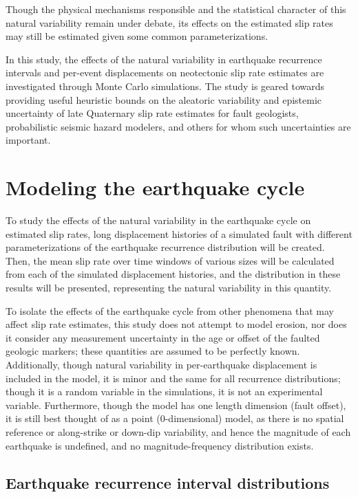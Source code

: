 \documentclass[se, manuscript]{copernicus}
\begin{document}
Though the physical mechanisms responsible and the statistical character of 
this natural variability remain under debate, its effects on the estimated slip 
rates may still be estimated given some common parameterizations.

In this study, the effects of the natural variability in earthquake
recurrence intervals and per-event displacements on neotectonic slip
rate estimates are investigated through Monte Carlo simulations. The
study is geared towards providing useful heuristic bounds on the
aleatoric variability and epistemic uncertainty of late Quaternary slip rate
estimates for fault geologists, probabilistic seismic hazard modelers,
and others for whom such uncertainties are important.


\section{Modeling the earthquake
cycle}\label{modeling-the-earthquake-cycle}

To study the effects of the natural variability in the earthquake cycle
on estimated slip rates, long displacement histories of a simulated
fault with different parameterizations of the earthquake recurrence
distribution will be created. Then, the mean slip rate over time windows
of various sizes will be calculated from each of the simulated
displacement histories, and the distribution in these results will be
presented, representing the natural variability in this quantity.

To isolate the effects of the earthquake cycle from other phenomena that
may affect slip rate estimates, this study does not attempt to model
erosion, nor does it consider any measurement uncertainty in the age or
offset of the faulted geologic markers; these quantities are assumed
to be perfectly known. Additionally, though natural variability in
per-earthquake displacement is included in the model, it is minor and
the same for all recurrence distributions; though it is a random variable in the
simulations, it is not an experimental variable. Furthermore, though the model
has one length dimension (fault offset), it is still best thought of as
a point (0-dimensional) model, as there is no spatial reference or
along-strike or down-dip variability, and hence the magnitude of each
earthquake is undefined, and no magnitude-frequency distribution exists.

\subsection{Earthquake recurrence interval
distributions}\label{earthquake-recurrence-interval-distributions}
\end{document}
